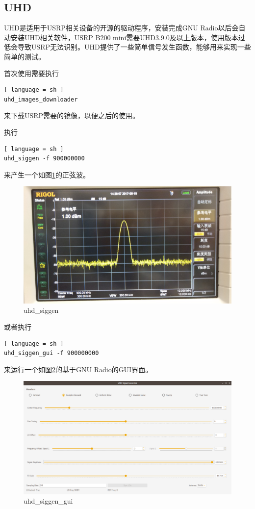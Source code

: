 		\subsection{UHD}
			\par UHD是适用于USRP相关设备的开源的驱动程序，安装完成GNU Radio以后会自动安装UHD相关软件，USRP B200 mini需要UHD3.9.0及以上版本，使用版本过低会导致USRP无法识别。UHD提供了一些简单信号发生函数，能够用来实现一些简单的测试。
			\par 首次使用需要执行
			\begin{lstlisting}[ language = sh ]
uhd_images_downloader
			\end{lstlisting}
			\par 来下载USRP需要的镜像，以便之后的使用。
			\par 执行
			\begin{lstlisting}[ language = sh ]
uhd_siggen -f 900000000
			\end{lstlisting}
			\par 来产生一个如图\ref{fig:uhd_siggen}的正弦波。
			\begin{figure}[htp]
				\centering
				\includegraphics[width=13cm]{figures/uhd_siggen.jpg}
				\caption{uhd\_siggen}
				\label{fig:uhd_siggen}
			\end{figure}
			\par 或者执行
			\begin{lstlisting}[ language = sh ]
uhd_siggen_gui -f 900000000
			\end{lstlisting}
			\par 来运行一个如图\ref{fig:uhd_siggen_gui}的基于GNU Radio的GUI界面。
			\begin{figure}[htp]
				\centering
				\includegraphics[width=13cm]{figures/uhd_siggen_gui.png}
				\caption{uhd\_siggen\_gui}
				\label{fig:uhd_siggen_gui}
			\end{figure}
